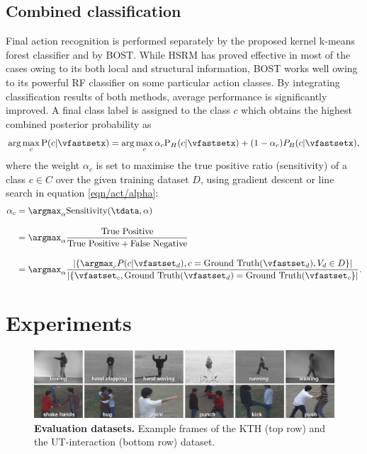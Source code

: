 \subsection{Combined classification} 
Final action recognition is performed separately by the proposed kernel k-means forest classifier and by BOST. While HSRM has proved effective in most of the cases owing to its both local and structural information, BOST works well owing to its powerful RF classifier on some particular action classes. By integrating classification results of both methods, average performance is significantly improved. A final class label is assigned to the class $c$ which obtains the highest combined posterior probability as
\begin{equation}
	\arg\max_{c}
	\mathrm{P}(c|\vfastsetx) = 
	\arg\max_{c}
	\alpha_c \mathrm{P}_{H}(c|\vfastsetx) + (1 - \alpha_c) P_{B}(c|\vfastsetx),
	\label{eqn/act/combine}
\end{equation}
where the weight $\alpha_c$ is set to maximise the true positive ratio (sensitivity) of a class $c \in C$ over the given training dataset $D$, using gradient descent or line search in equation \ref{eqn/act/alpha}:
\begin{equation}
\begin{aligned}
	\alpha_c & = \displaystyle\argmax_{\alpha}\mbox{Sensitivity}(\tdata,\alpha) \\[3mm]
	& = \displaystyle\argmax_{\alpha}\displaystyle\frac{\mbox{True Positive}}{\mbox{True Positive} + \mbox{False Negative}} \\[3mm]
&= \displaystyle\argmax_{\alpha}\displaystyle\frac{\left|\{\displaystyle\argmax_{c}P(c|\vfastset_d),c=\mbox{Ground Truth}(\vfastset_d),V_d \in D\}\right|}{\left|\{\vfastset_c, \mbox{Ground Truth}(\vfastset_d) = \mbox{Ground Truth}(\vfastset_c\}\right|}.
\end{aligned}
\label{eqn/act/alpha}
\end{equation}

\section{Experiments}
\label{sec/act/experiments}

\begin{figure}[th]
	\centering
	\includegraphics[width=1\linewidth]{fig/act/frames.png}
	\caption{\textbf{Evaluation datasets.} Example frames of the KTH (top row) and the UT-interaction (bottom row) dataset.}
	\label{fig/act/frames}
\end{figure}

